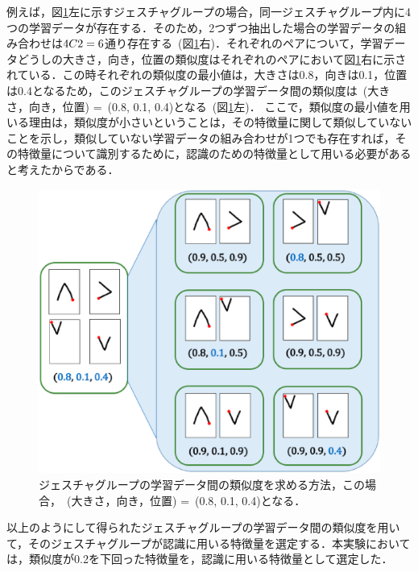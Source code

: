 例えば，図\ref{fig:group_similarity}左に示すジェスチャグループの場合，同一ジェスチャグループ内に4つの学習データが存在する．そのため，2つずつ抽出した場合の学習データの組み合わせは${\scriptsize 4}C{\scriptsize 2}=6$通り存在する~(図\ref{fig:group_similarity}右)．それぞれのペアについて，学習データどうしの大きさ，向き，位置の類似度はそれぞれのペアにおいて図\ref{fig:group_similarity}右に示されている．この時それぞれの類似度の最小値は，大きさは0.8，向きは0.1，位置は0.4となるため，このジェスチャグループの学習データ間の類似度は~(大きさ，向き，位置) =~(0.8, 0.1, 0.4)となる~(図\ref{fig:group_similarity}左)．
ここで，類似度の最小値を用いる理由は，類似度が小さいということは，その特徴量に関して類似していないことを示し，類似していない学習データの組み合わせが1つでも存在すれば，その特徴量について識別するために，認識のための特徴量として用いる必要があると考えたからである．

\begin{figure} [h!]
	\begin{center}
		\includegraphics [width=0.8\hsize ]{img/group_similarity.eps}
	\end{center}
	\caption{ジェスチャグループの学習データ間の類似度を求める方法，この場合，~(大きさ，向き，位置) =~(0.8, 0.1, 0.4)となる．}
	\label{fig:group_similarity}
\end{figure}

以上のようにして得られたジェスチャグループの学習データ間の類似度を用いて，そのジェスチャグループが認識に用いる特徴量を選定する．本実験においては，類似度が0.2を下回った特徴量を，認識に用いる特徴量として選定した．


